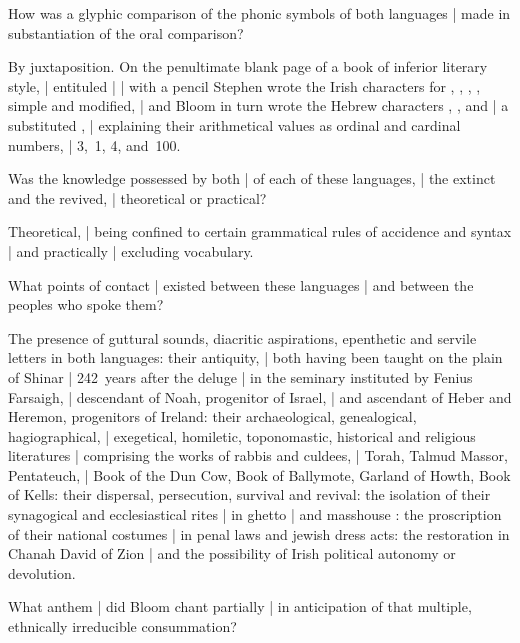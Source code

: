 How was a glyphic comparison of the phonic symbols of both languages |
made in substantiation of the oral comparison?

\Philosophy
By juxtaposition.
On the penultimate blank page of a book of inferior literary style, |
entituled  |
 |
with a pencil
Stephen wrote the Irish characters
for , , , , simple and modified, |
and Bloom in turn
wrote the Hebrew characters , , 
and
 |
a substituted , |
explaining their arithmetical values as ordinal and cardinal numbers, |
 3,~1, 4, and~100.


Was the knowledge possessed by both |
of each of these languages, |
the extinct and the revived, |
theoretical or practical?

\Philosophy
Theoretical, |
being confined to certain grammatical rules of accidence and syntax |
and practically |
excluding vocabulary.


What points of contact |
existed between these languages |
and between the peoples who spoke them?

\Religious
The presence of guttural sounds, diacritic aspirations,
epenthetic and servile letters in both languages:
their antiquity, |
both having been taught on the plain of Shinar |
242~years after the deluge |
in the seminary instituted by Fenius Farsaigh, |
descendant of Noah, progenitor of Israel, |
and ascendant of Heber and Heremon, progenitors of Ireland:
their archaeological, genealogical, hagiographical, |
exegetical, homiletic, toponomastic, historical and religious literatures |
comprising the works of rabbis and culdees, |
Torah, Talmud
Massor, Pentateuch, |
Book of the Dun Cow, Book of Ballymote, Garland of Howth, Book of Kells:
their dispersal, persecution, survival and revival:
the isolation of their synagogical and ecclesiastical rites |
in ghetto
 |
and masshouse
:
the proscription of their national costumes |
in penal laws and jewish dress acts:
the restoration in Chanah David of Zion |
and the possibility of
Irish political autonomy or devolution.


What anthem |
did Bloom chant partially |
in anticipation of that multiple, ethnically irreducible consummation?

